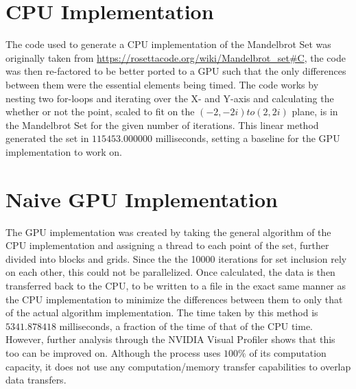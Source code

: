 \documentclass[a4paper,10pt]{article}
\begin{document}
\section{CPU Implementation}
The code used to generate a CPU implementation of the Mandelbrot Set was originally taken from \url{https://rosettacode.org/wiki/Mandelbrot_set#C}, the code was then re-factored to be better ported to a GPU such that the only differences between them were the essential elements being timed. The code works by nesting two for-loops and iterating over the X- and Y-axis and calculating the whether or not the point, scaled to fit on the $(-2,-2i) to (2,2i)$ plane, is in the Mandelbrot Set for the given number of iterations. This linear method generated the set in $115453.000000$ milliseconds, setting a baseline for the GPU implementation to work on.

\section{Naive GPU Implementation}
The GPU implementation was created by taking the general algorithm of the CPU implementation and assigning a thread to each point of the set, further divided into blocks and grids. Since the the 10000 iterations for set inclusion rely on each other, this could not be parallelized. Once calculated, the data is then transferred back to the CPU, to be written to a file in the exact same manner as the CPU implementation to minimize the differences between them to only that of the actual algorithm implementation. The time taken by this method is $5341.878418$ milliseconds, a fraction of the time of that of the CPU time. However, further analysis through the NVIDIA Visual Profiler shows that this too can be improved on. Although the process uses $100\%$ of its computation capacity, it does not use any computation/memory transfer capabilities to overlap data transfers.
\end{document}
